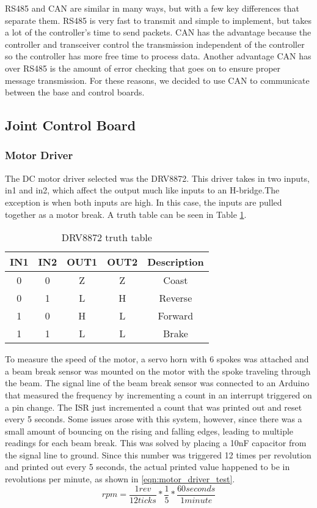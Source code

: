 \noindent RS485 and CAN are similar in many ways, but with a few key differences that separate them. RS485 is very fast to transmit and simple to implement, but takes a lot of the controller's time to send packets. CAN has the advantage because the controller and transceiver control the transmission independent of the controller so the controller has more free time to process data. Another advantage CAN has over RS485 is the amount of error checking that goes on to ensure proper message transmission. For these reasons, we decided to use CAN to communicate between the base and control boards.

\subsection{Joint Control Board}
\subsubsection{Motor Driver}
The DC motor driver selected was the DRV8872. This driver takes in two inputs, in1 and in2, which affect the output much like inputs to an H-bridge.The exception is when both inputs are high. In this case, the inputs are pulled together as a motor break. A truth table can be seen in Table \ref{tbl:drv8872-truth6}.

\begin{table}[H]
	\centering
	\caption{DRV8872 truth table}
	\begin{tabular}{| c | c | c | c| c |}
		\hline
		IN1 & IN2 & OUT1 & OUT2 & Description \\
		\hline
		0 & 0 & Z & Z & Coast \\
		0 & 1 & L & H & Reverse \\
		1 & 0 & H & L & Forward \\
		1 & 1 & L & L & Brake \\
		\hline
	\end{tabular}
	\label{tbl:drv8872-truth6}
\end{table}

\noindent To measure the speed of the motor, a servo horn with 6 spokes was attached and a beam break sensor was mounted on the motor with the spoke traveling through the beam. The signal line of the beam break sensor was connected to an Arduino that measured the frequency by incrementing a count in an interrupt triggered on a pin change. The ISR just incremented a count that was printed out and reset every 5 seconds. Some issues arose with this system, however, since there was a small amount of bouncing on the rising and falling edges, leading to multiple readings for each beam break. This was solved by placing a 10nF capacitor from the signal line to ground. Since this number was triggered 12 times per revolution and printed out every 5 seconds, the actual printed value happened to be in revolutions per minute, as shown in \ref{eqn:motor_driver_test}.
\begin{equation}
rpm = \frac{1 rev}{12 ticks} * \frac{1}{5} * \frac{60 seconds}{1 minute}
\label{eqn:motor_driver_test}
\end{equation}

